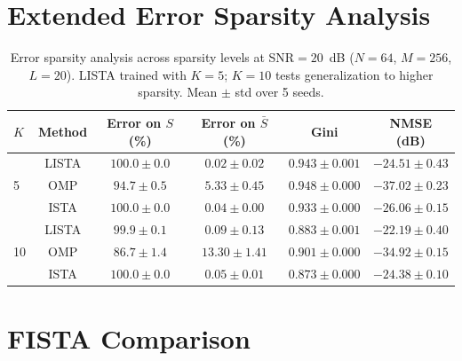 \documentclass[a4paper,fleqn]{cas-sc}
\begin{document}
\section{Extended Error Sparsity Analysis}\label{sec:supp_sparsity_extended}

\begin{table}[width=.9\linewidth,cols=6,pos=h]
\caption{Error sparsity analysis across sparsity levels at SNR$=20$~dB ($N=64$, $M=256$, $L=20$). LISTA trained with $K=5$; $K=10$ tests generalization to higher sparsity. Mean $\pm$ std over 5 seeds.}\label{tab:error_sparsity_extended}
\begin{tabular*}{\tblwidth}{@{} LCCCCC@{}}
\toprule
$K$ & Method & Error on $S$ (\%) & Error on $\bar{S}$ (\%) & Gini & NMSE (dB) \\
\midrule
{}
  & LISTA & $\bm{100.0} \pm 0.0$ & $\bm{0.02} \pm 0.02$ & $0.943 \pm 0.001$ & $-24.51 \pm 0.43$ \\
  & OMP   & $94.7 \pm 0.5$ & $5.33 \pm 0.45$ & $0.948 \pm 0.000$ & $-37.02 \pm 0.23$ \\
  & ISTA  & $100.0 \pm 0.0$ & $0.04 \pm 0.00$ & $0.933 \pm 0.000$ & $-26.06 \pm 0.15$ \\
\midrule
{}
  & LISTA & $\bm{99.9} \pm 0.1$ & $\bm{0.09} \pm 0.13$ & $0.883 \pm 0.001$ & $-22.19 \pm 0.40$ \\
  & OMP   & $86.7 \pm 1.4$ & $13.30 \pm 1.41$ & $0.901 \pm 0.000$ & $-34.92 \pm 0.15$ \\
  & ISTA  & $100.0 \pm 0.0$ & $0.05 \pm 0.01$ & $0.873 \pm 0.000$ & $-24.38 \pm 0.10$ \\
\bottomrule
\end{tabular*}
\end{table}


\section{FISTA Comparison}\label{sec:supp_fista}
\end{document}
